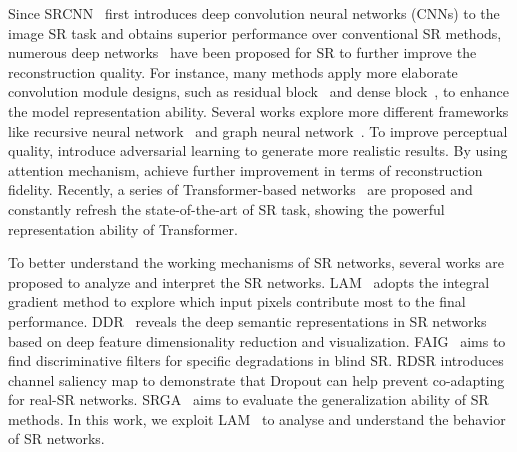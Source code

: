 \documentclass[10pt,twocolumn,letterpaper]{article}
\begin{document}
Since SRCNN~\cite{srcnn_eccv} first introduces deep convolution neural networks (CNNs) to the image SR task and obtains superior performance over conventional SR methods, numerous deep networks~\cite{srcnn_tpami,fsrcnn,pixelshuffle,vdsr,edsr,rdn,rcan,san,han,nlsn,swinir,edt} have been proposed for SR to further improve the reconstruction quality. For instance, many methods apply more elaborate convolution module designs, such as residual block~\cite{srgan,edsr} and dense block~\cite{esrgan,rdn}, to enhance the model representation ability. Several works explore more different frameworks like recursive neural network~\cite{drcn,drrn} and graph neural network~\cite{ignn}. To improve perceptual quality, \cite{srgan,esrgan,ranksrgan,realesrgan} introduce adversarial learning to generate more realistic results. By using attention mechanism, \cite{rcan,san,rnan,nlrn,han,nlsn} achieve further improvement in terms of reconstruction fidelity. Recently, a series of Transformer-based networks~\cite{ipt,swinir,edt} are proposed and constantly refresh the state-of-the-art of SR task, showing the powerful representation ability of Transformer.  

To better understand the working mechanisms of SR networks, several works are proposed to analyze and interpret the SR networks. LAM~\cite{lam} adopts the integral gradient method to explore which input pixels contribute most to the final performance. DDR~\cite{ddr} reveals the deep semantic representations in SR networks based on deep feature dimensionality reduction and visualization. FAIG~\cite{faig} aims to find discriminative filters for specific degradations in blind SR. RDSR\cite{dropoutSR} introduces channel saliency map to demonstrate that Dropout can help prevent co-adapting for real-SR networks. SRGA~\cite{srga} aims to evaluate the generalization ability of SR methods. In this work, we exploit LAM~\cite{lam} to analyse and understand the behavior of SR networks.
\end{document}
